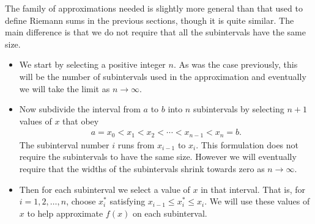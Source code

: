 The family of approximations needed is slightly more general than that used to
define
Riemann sums in the previous sections, though it is quite similar. The main
difference is
that we do not require that all the subintervals have the same size.
\begin{itemize}
\item We start by selecting a positive integer $n$. As was the case previously,
this will
be the number of subintervals used in the approximation and eventually we will
take the
limit as $n \to \infty$.

\item Now subdivide the interval from $a$ to $b$ into $n$ subintervals by
selecting $n+1$
values of $x$ that obey
\begin{align*}
a=x_0<x_1<x_2<\cdots<x_{n-1}<x_n=b.
\end{align*}
The subinterval number $i$ runs from $x_{i-1}$ to $x_i$. This formulation does
not require the subintervals to have the same size. However we will eventually
require
that the widths of the subintervals shrink towards zero as $n\to\infty$.

\item Then for each subinterval we select a value of $x$ in that interval. That
is, for
$i=1,2,\dots,n$, choose $x_i^*$ satisfying $x_{i-1} \leq x_i^* \leq x_i$. We
will use
these values of $x$ to help approximate $f(x)$ on each subinterval.


\end{itemize}
